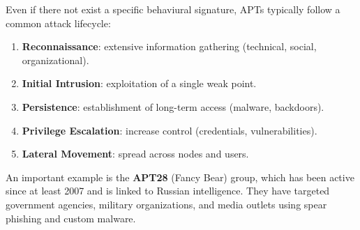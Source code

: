 \noindent
Even if there not exist a specific behaviural signature, APTs typically follow a common attack lifecycle:
\begin{enumerate}
    \item \textbf{Reconnaissance}: extensive information gathering (technical, social, organizational).
    \item \textbf{Initial Intrusion}: exploitation of a single weak point.
    \item \textbf{Persistence}: establishment of long-term access (malware, backdoors).
    \item \textbf{Privilege Escalation}: increase control (credentials, vulnerabilities).
    \item \textbf{Lateral Movement}: spread across nodes and users.
\end{enumerate}

\noindent
An important example is the \textbf{APT28} (Fancy Bear) group, which has been active since at least 2007 and is linked to Russian intelligence. They have targeted government agencies, military organizations, and media outlets using spear phishing and custom malware.



